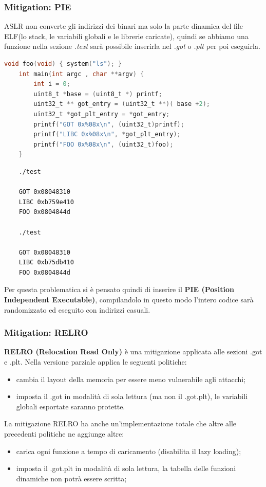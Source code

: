 \subsubsection{Mitigation: PIE}
ASLR non converte gli indirizzi dei binari ma solo la parte dinamica del file ELF(lo stack, le variabili globali e le librerie caricate), quindi se abbiamo una funzione nella sezione \textit{.text} sarà possibile inserirla nel \textit{.got} o \textit{.plt} per poi eseguirla.
\begin{lstlisting}[language=C]
    void foo(void) { system("ls"); }
    int main(int argc , char **argv) {
        int i = 0;
        uint8_t *base = (uint8_t *) printf;
        uint32_t ** got_entry = (uint32_t **)( base +2);
        uint32_t *got_plt_entry = *got_entry;
        printf("GOT 0x%08x\n", (uint32_t)printf);
        printf("LIBC 0x%08x\n", *got_plt_entry);
        printf("FOO 0x%08x\n", (uint32_t)foo);
    }
\end{lstlisting}
\begin{lstlisting}
    ./test

    GOT 0x08048310
    LIBC 0xb759e410
    FOO 0x0804844d

    ./test

    GOT 0x08048310
    LIBC 0xb75db410
    FOO 0x0804844d
\end{lstlisting}

Per questa problematica si è pensato quindi di inserire il \textbf{PIE (Position Independent Executable)}, compilandolo in questo modo l'intero codice sarà randomizzato ed eseguito con indirizzi casuali.

\subsubsection{Mitigation: RELRO}
\textbf{RELRO (Relocation Read Only)} è una mitigazione applicata alle sezioni .got e .plt.
Nella versione parziale applica le seguenti politiche:
\begin{itemize}
    \item cambia il layout della memoria per essere meno vulnerabile agli attacchi;
    \item imposta il .got in modalità di sola lettura (ma non il .got.plt), le variabili globali esportate saranno protette.
\end{itemize}

La mitigazione RELRO ha anche un'implementazione totale che altre alle precedenti politiche ne aggiunge altre:
\begin{itemize}
    \item carica ogni funzione a tempo di caricamento (disabilita il lazy loading);
    \item imposta il .got.plt in modalità di sola lettura, la tabella delle funzioni dinamiche non potrà essere scritta;
\end{itemize}
